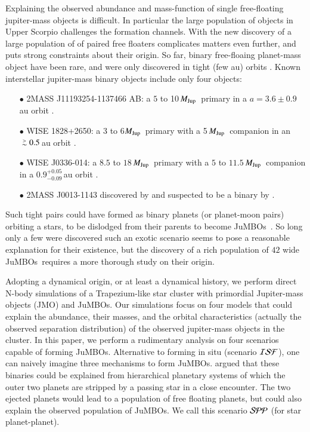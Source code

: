 \documentclass[submission,phys]{lib/SciPost}
\newcommand{\MJup}{\mbox{${M}_{\rm Jup}$}}
\def\apgt{\ {\raise-.5ex\hbox{$\buildrel>\over\sim$}}\ }
\newcommand{\jumbos}{\mbox{JuMBOs}}
\begin{document}
Explaining the observed abundance and mass-function of single
free-floating jupiter-mass objects is difficult.  In particular the
large population of objects in Upper Scorpio challenges the formation
channels. With the new discovery of a large population of of paired
free floaters complicates matters even further, and puts strong
constraints about their origin. So far, binary free-floaing
planet-mass object have been rare, and were only discovered in tight
(few au) orbits \cite{2021ApJS..253....7K}.  Known interstellar
jupiter-mass binary objects include only four objects:
\begin{itemize}
\item[$\bullet$]2MASS J11193254-1137466 AB: a $5$ to 10\,\MJup\,
  primary in a $a=3.6\pm0.9$\,au orbit \cite{2017ApJ...843L...4B}.
\item[$\bullet$]WISE 1828+2650: a 3 to 6\MJup\, primary with a
  5\,\MJup\ companion in an $\apgt 0.5$\,au orbit
  \cite{2013ApJ...764..101B}.
\item[$\bullet$] WISE J0336-014: a $8.5$ to
  $18$\,\MJup\ primary with a $5$ to $11.5$\,\MJup\, companion in a
  $0.9^{+0.05}_{-0.09}$\,au orbit \cite{2023ApJ...947L..30C}.
\item[$\bullet$]2MASS J0013-1143 discovered by \cite{2017AJ....154..112K} and
  suspected to be a binary by \cite{2019A&A...629A.145E}.
\end{itemize}

Such tight pairs could have formed as binary planets (or planet-moon
pairs) orbiting a stars, to be dislodged from their parents to become
\jumbos\, \cite{2016ApJ...819..125C}.  So long only a few were
discovered such an exotic scenario seems to pose a reasonable
explanation for their existence, but the discovery of a rich
population of $42$ wide \jumbos\, \cite{2023arXiv231001231P} requires
a more thorough study on their origin.

Adopting a dynamical origin, or at least a dynamical history, we
perform direct N-body simulations of a Trapezium-like star cluster
with primordial Jupiter-mass objects (JMO) and \jumbos. Our
simulations focus on four models that could explain the abundance,
their masses, and the orbital characteristics (actually the observed
separation distribution) of the observed jupiter-mass objects in the
cluster. In this paper, we perform a rudimentary analysis on four
scenarios capable of forming \jumbos.  Alternative to forming in situ
(scenario ${\cal ISF}$), one can naively imagine three mechanisms to
form \jumbos. \cite{2023arXiv231006016W} argued that these binaries
could be explained from hierarchical planetary systems of which the
outer two planets are stripped by a passing star in a close
encounter. The two ejected planets would lead to a population of free
floating planets, but could also explain the observed population of
\jumbos.  We call this scenario ${\cal SPP}$ (for star planet-planet).
\end{document}
